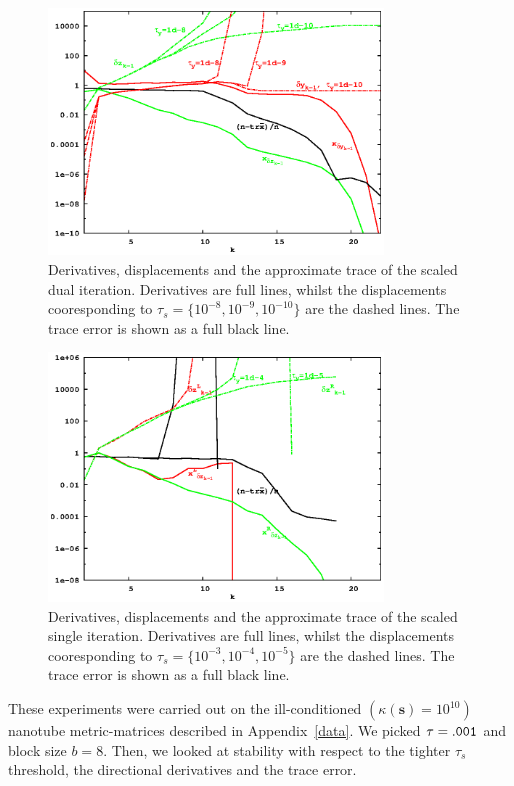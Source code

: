 \documentclass[letterpaper,twocolumn,amsmath,amsfont,amssymb,english,aps,jcp,preprintnumbers,groupaddress,nofootinbib,tightenlines,floatfix]{revtex4}
\newcommand{\mat}[1]{\boldsymbol{#1}}
\theoremstyle{plain}
\theoremstyle{remark}
\theoremstyle{plain}
\begin{document}
\begin{figure}[h] 
\includegraphics[width=3.5in]{fig_33_tube_cond_10_scaled/33_tube_k10_scale_dual.eps}
\caption{Derivatives, displacements and the approximate trace of the scaled dual iteration.
Derivatives are full lines, whilst the displacements cooresponding to $\tau_s=\{10^{-8}, 10^{-9}, 10^{-10}\}$
are the dashed lines.  The trace error is shown as a full black line. }\label{flow_unscaled_dual}
\end{figure}

\begin{figure}[h]
\includegraphics[width=3.5in]{fig_33_tube_cond_10_scaled/33_tube_k10_scale_stab.eps}
\caption{Derivatives, displacements and the approximate trace of the scaled single iteration.
Derivatives are full lines, whilst the displacements cooresponding to $\tau_s=\{10^{-3}, 10^{-4}, 10^{-5}\}$
are the dashed lines.  The trace error is shown as a full black line. }\label{flow_scaled_dual}
\end{figure}

These experiments were carried out on the ill-conditioned $(\kappa(\mat{s})=10^{10})$ nanotube metric-matrices described in Appendix~\ref{data}.
We picked  $\tau ={\tt .001}$ and block size $b = 8$.  Then, we looked at stability with respect to the tighter $\tau_s$ threshold, 
the directional derivatives and the trace error.   
\end{document}
